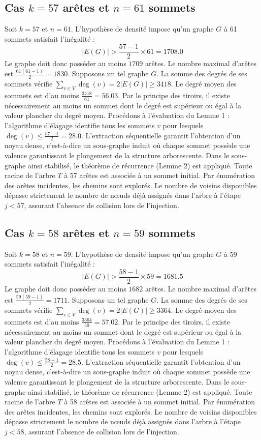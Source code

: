 \documentclass[12pt,a4paper]{article}
\begin{document}
\subsection{Cas $k = 57$ arêtes et $n = 61$ sommets}
Soit $k = 57$ et $n = 61$. L'hypothèse de densité impose qu'un graphe $G$ à 61 sommets satisfait l'inégalité :
$$ |E(G)| > \frac{57-1}{2} \times 61 = 1708.0 $$
Le graphe doit donc posséder au moins $1709$ arêtes. Le nombre maximal d'arêtes est $\frac{61(61-1)}{2} = 1830$.
Supposons un tel graphe $G$. La somme des degrés de ses sommets vérifie $\sum_{v \in V} \deg(v) = 2|E(G)| \geq 3418$.
Le degré moyen des sommets est d'au moins $\frac{3418}{61} = 56.03$.
Par le principe des tiroirs, il existe nécessairement au moins un sommet dont le degré est supérieur ou égal à la valeur plancher du degré moyen.
Procédons à l'évaluation du Lemme 1 : l'algorithme d'élagage identifie tous les sommets $v$ pour lesquels $\deg(v) \leq \frac{57-1}{2} = 28.0$.
L'extraction séquentielle garantit l'obtention d'un noyau dense, c'est-à-dire un sous-graphe induit où chaque sommet possède une valence garantissant le plongement de la structure arborescente.
Dans le sous-graphe ainsi stabilisé, le théorème de récurrence (Lemme 2) est appliqué. Toute racine de l'arbre $T$ à 57 arêtes est associée à un sommet initial. Par énumération des arêtes incidentes, les chemins sont explorés. Le nombre de voisins disponibles dépasse strictement le nombre de nœuds déjà assignés dans l'arbre à l'étape $j < 57$, assurant l'absence de collision lors de l'injection.

\subsection{Cas $k = 58$ arêtes et $n = 59$ sommets}
Soit $k = 58$ et $n = 59$. L'hypothèse de densité impose qu'un graphe $G$ à 59 sommets satisfait l'inégalité :
$$ |E(G)| > \frac{58-1}{2} \times 59 = 1681.5 $$
Le graphe doit donc posséder au moins $1682$ arêtes. Le nombre maximal d'arêtes est $\frac{59(59-1)}{2} = 1711$.
Supposons un tel graphe $G$. La somme des degrés de ses sommets vérifie $\sum_{v \in V} \deg(v) = 2|E(G)| \geq 3364$.
Le degré moyen des sommets est d'au moins $\frac{3364}{59} = 57.02$.
Par le principe des tiroirs, il existe nécessairement au moins un sommet dont le degré est supérieur ou égal à la valeur plancher du degré moyen.
Procédons à l'évaluation du Lemme 1 : l'algorithme d'élagage identifie tous les sommets $v$ pour lesquels $\deg(v) \leq \frac{58-1}{2} = 28.5$.
L'extraction séquentielle garantit l'obtention d'un noyau dense, c'est-à-dire un sous-graphe induit où chaque sommet possède une valence garantissant le plongement de la structure arborescente.
Dans le sous-graphe ainsi stabilisé, le théorème de récurrence (Lemme 2) est appliqué. Toute racine de l'arbre $T$ à 58 arêtes est associée à un sommet initial. Par énumération des arêtes incidentes, les chemins sont explorés. Le nombre de voisins disponibles dépasse strictement le nombre de nœuds déjà assignés dans l'arbre à l'étape $j < 58$, assurant l'absence de collision lors de l'injection.
\end{document}
